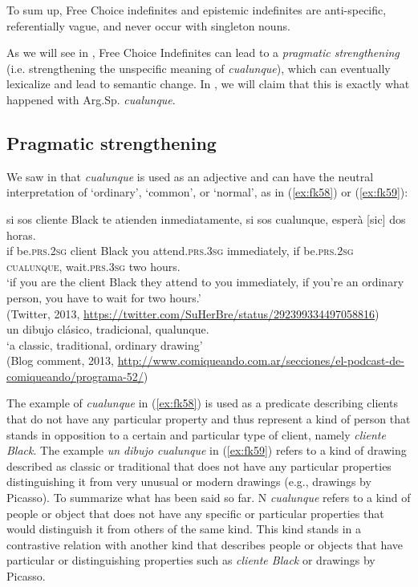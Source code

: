 \documentclass[output=paper,colorlinks,citecolor=brown]{langscibook}
\begin{document}
To sum up, Free Choice indefinites and epistemic indefinites are anti-specific, referentially vague, and never occur with singleton nouns.

As we will see in  , Free Choice Indefinites can lead to a \textit{pragmatic strengthening} (i.e. strengthening the unspecific meaning of \textit{cualunque}), which can eventually lexicalize and lead to semantic change. In  , we will claim that this is exactly what happened with Arg.Sp. \textit{cualunque}.


\subsection{Pragmatic strengthening}\label{sec:fk5.2}


We saw in   that \textit{cualunque} is used as an adjective and can have the neutral interpretation of ‘ordinary’, ‘common’, or ‘normal’, as in (\ref{ex:fk58}) or (\ref{ex:fk59}):

\ea \label{ex:fk58}
    \gll si sos cliente Black te atienden inmediatamente, si sos 
cualunque, esperà [sic] dos horas.\\
    if be.\textsc{prs.2sg} client Black you attend.\textsc{prs.3sg} immediately, if  be.\textsc{prs.2sg} \textsc{cualunque}, wait.\textsc{prs.3sg} two hours.\\
\glt ‘if you are the client Black they attend to you immediately, if you’re an ordinary person, you have to wait for two hours.’\\
(Twitter, 2013, \url{https://twitter.com/SuHerBre/status/292399334497058816})\\

\ex \label{ex:fk59}
     un dibujo clásico, tradicional, qualunque.\\
    ‘a classic, traditional, ordinary drawing’\\
    (Blog comment, 2013, \url{http://www.comiqueando.com.ar/secciones/el-podcast-de-comiqueando/programa-52/})
\z

The example of \textit{cualunque} in (\ref{ex:fk58}) is used as a predicate describing clients that do not have any particular property and thus represent a kind of person that stands in opposition to a certain and particular type of client, namely \textit{cliente Black}. The example \textit{un dibujo cualunque} in (\ref{ex:fk59}) refers to a kind of drawing described as classic or traditional that does not have any particular properties distinguishing it from very unusual or modern drawings (e.g., drawings by Picasso). To summarize what has been said so far. N \textit{cualunque} refers to a kind of people or object that does not have any specific or particular properties that would distinguish it from others of the same kind. This kind stands in a contrastive relation with another kind that describes people or objects that have particular or distinguishing properties such as \textit{cliente Black} or drawings by Picasso.
\end{document}
